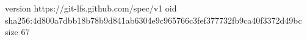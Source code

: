 version https://git-lfs.github.com/spec/v1
oid sha256:4d800a7dbb18b78b9d841ab6304e9c965766c3fef377732fb9ca40f3372d49bc
size 67
